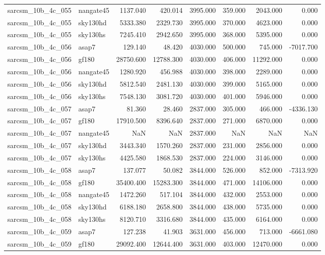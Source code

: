 \begin{tabular}{llrrrrrr}
sarcsm\_10b\_4c\_055 & nangate45 & 1137.040 & 420.014 & 3995.000 & 359.000 & 2043.000 & 0.000 \\
sarcsm\_10b\_4c\_055 & sky130hd & 5333.380 & 2329.730 & 3995.000 & 370.000 & 4623.000 & 0.000 \\
sarcsm\_10b\_4c\_055 & sky130hs & 7245.410 & 2942.650 & 3995.000 & 368.000 & 5395.000 & 0.000 \\
sarcsm\_10b\_4c\_056 & asap7 & 129.140 & 48.420 & 4030.000 & 500.000 & 745.000 & -7017.700 \\
sarcsm\_10b\_4c\_056 & gf180 & 28750.600 & 12788.300 & 4030.000 & 406.000 & 11292.000 & 0.000 \\
sarcsm\_10b\_4c\_056 & nangate45 & 1280.920 & 456.988 & 4030.000 & 398.000 & 2289.000 & 0.000 \\
sarcsm\_10b\_4c\_056 & sky130hd & 5812.540 & 2481.130 & 4030.000 & 399.000 & 5165.000 & 0.000 \\
sarcsm\_10b\_4c\_056 & sky130hs & 7548.130 & 3081.720 & 4030.000 & 401.000 & 5946.000 & 0.000 \\
sarcsm\_10b\_4c\_057 & asap7 & 81.360 & 28.460 & 2837.000 & 305.000 & 466.000 & -4336.130 \\
sarcsm\_10b\_4c\_057 & gf180 & 17910.500 & 8396.640 & 2837.000 & 271.000 & 6870.000 & 0.000 \\
sarcsm\_10b\_4c\_057 & nangate45 & NaN & NaN & 2837.000 & NaN & NaN & NaN \\
sarcsm\_10b\_4c\_057 & sky130hd & 3443.340 & 1570.260 & 2837.000 & 231.000 & 2856.000 & 0.000 \\
sarcsm\_10b\_4c\_057 & sky130hs & 4425.580 & 1868.530 & 2837.000 & 224.000 & 3146.000 & 0.000 \\
sarcsm\_10b\_4c\_058 & asap7 & 137.077 & 50.082 & 3844.000 & 526.000 & 852.000 & -7313.920 \\
sarcsm\_10b\_4c\_058 & gf180 & 35400.400 & 15283.300 & 3844.000 & 471.000 & 14106.000 & 0.000 \\
sarcsm\_10b\_4c\_058 & nangate45 & 1472.260 & 517.104 & 3844.000 & 432.000 & 2553.000 & 0.000 \\
sarcsm\_10b\_4c\_058 & sky130hd & 6188.180 & 2658.800 & 3844.000 & 438.000 & 5735.000 & 0.000 \\
sarcsm\_10b\_4c\_058 & sky130hs & 8120.710 & 3316.680 & 3844.000 & 435.000 & 6164.000 & 0.000 \\
sarcsm\_10b\_4c\_059 & asap7 & 127.238 & 41.903 & 3631.000 & 456.000 & 713.000 & -6661.080 \\
sarcsm\_10b\_4c\_059 & gf180 & 29092.400 & 12644.400 & 3631.000 & 403.000 & 12470.000 & 0.000 \\

\end{tabular}
